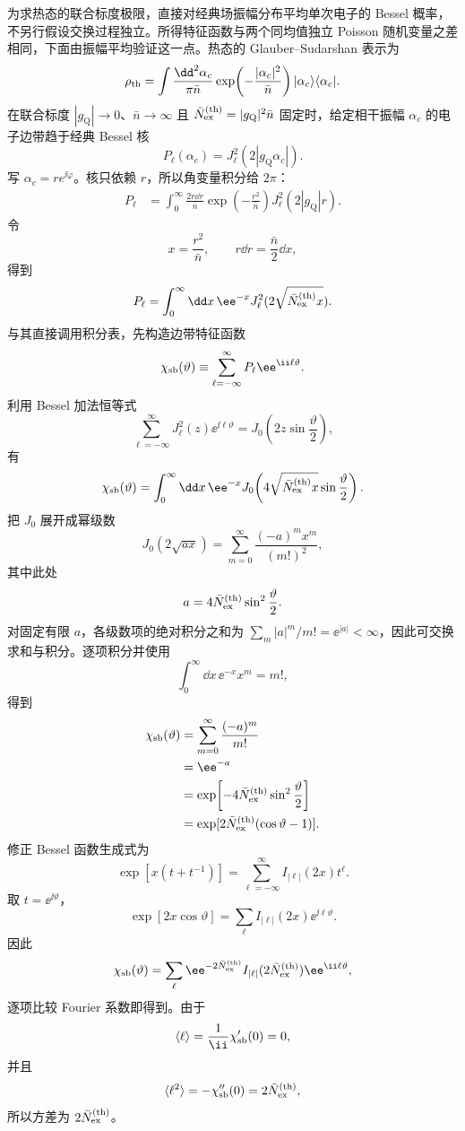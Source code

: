 \begin{exbox}[光子统计反演与电子后选择条件操作]
为求热态的联合标度极限，直接对经典场振幅分布平均单次电子的 Bessel 概率，不另行假设交换过程独立。所得特征函数与两个同均值独立 Poisson 随机变量之差相同，下面由振幅平均验证这一点。热态的 Glauber--Sudarshan 表示为
\[
\rho_{\rm th}
=\int\frac{\dd^2 \alpha_c}{\pi\bar n}
\exp\!\left(-\frac{|\alpha_c|^2}{\bar n}\right)
|\alpha_c\rangle\langle\alpha_c|.
\]
在联合标度 $|g_{\mathrm Q}|\to0$、$\bar n\to\infty$ 且 $\bar N_{\rm ex}^{(\rm th)}=|g_{\mathrm Q}|^2\bar n$ 固定时，给定相干振幅 $\alpha_c$ 的电子边带趋于经典 Bessel 核
\[
P_\ell(\alpha_c)=J_\ell^2(2|g_{\mathrm Q}\alpha_c|).
\]
写 $\alpha_c=re^{\ii\varphi}$。核只依赖 $r$，所以角变量积分给 $2\pi$：
\begin{align*}
P_\ell
&=\int_0^\infty\frac{2r\dd r}{\bar n}
\exp\!\left(-\frac{r^2}{\bar n}\right)
J_\ell^2(2|g_{\mathrm Q}|r).
\end{align*}
令
\[
x=\frac{r^2}{\bar n},
\qquad
r\dd r=\frac{\bar n}{2}\dd x,
\]
得到
\[
P_\ell
=\int_0^\infty\dd x\,\ee^{-x}
J_\ell^2(2\sqrt{\bar N_{\rm ex}^{(\rm th)}x}).
\]
与其直接调用积分表，先构造边带特征函数
\[
\chi_{\rm sb}(\vartheta)
\equiv\sum_{\ell=-\infty}^{\infty}
P_\ell\ee^{\ii\ell\vartheta}.
\]
利用 Bessel 加法恒等式
\[
\sum_{\ell=-\infty}^{\infty}
J_\ell^2(z)\ee^{\ii\ell\vartheta}
=J_0\!\left(2z\sin\frac{\vartheta}{2}\right),
\]
有
\[
\chi_{\rm sb}(\vartheta)
=\int_0^\infty\dd x\,\ee^{-x}
J_0\!\left(4\sqrt{\bar N_{\rm ex}^{(\rm th)}x}\sin\frac{\vartheta}{2}\right).
\]
把 $J_0$ 展开成幂级数
\[
J_0(2\sqrt{ax})
=\sum_{m=0}^\infty
\frac{(-a)^m x^m}{(m!)^2},
\]
其中此处
\[
a=4\bar N_{\rm ex}^{(\rm th)}\sin^2\frac{\vartheta}{2}.
\]
对固定有限 $a$，各级数项的绝对积分之和为 $\sum_m |a|^m/m!=\ee^{|a|}<\infty$，因此可交换求和与积分。逐项积分并使用
\[
\int_0^\infty\dd x\,\ee^{-x}x^m=m!,
\]
得到
\begin{align*}
\chi_{\rm sb}(\vartheta)
&=\sum_{m=0}^\infty\frac{(-a)^m}{m!}\\
&=\ee^{-a}\\
&=\exp\!\left[-4\bar N_{\rm ex}^{(\rm th)}\sin^2\frac{\vartheta}{2}\right]\\
&=\exp[2\bar N_{\rm ex}^{(\rm th)}(\cos\vartheta-1)].
\end{align*}
修正 Bessel 函数生成式为
\[
\exp[x(t+t^{-1})]
=\sum_{\ell=-\infty}^{\infty}I_{|\ell|}(2x)t^\ell.
\]
取 $t=\ee^{\ii\vartheta}$，
\[
\exp[2x\cos\vartheta]
=\sum_\ell I_{|\ell|}(2x)\ee^{\ii\ell\vartheta}.
\]
因此
\[
\chi_{\rm sb}(\vartheta)
=\sum_\ell
\ee^{-2\bar N_{\rm ex}^{(\rm th)}}I_{|\ell|}(2\bar N_{\rm ex}^{(\rm th)})
\ee^{\ii\ell\vartheta},
\]
逐项比较 Fourier 系数即得到。由于
\[
\langle\ell\rangle
=\frac1{\ii}\chi_{\rm sb}'(0)=0,
\]
并且
\[
\langle\ell^2\rangle
=-\chi_{\rm sb}''(0)=2\bar N_{\rm ex}^{(\rm th)},
\]
所以方差为 $2\bar N_{\rm ex}^{(\rm th)}$。


\end{exbox}
